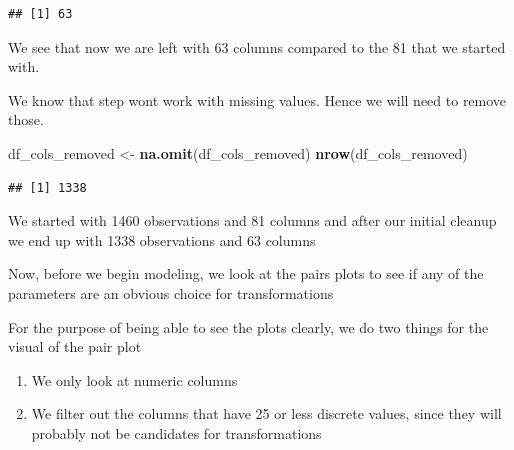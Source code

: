 \documentclass[
]{article}
\newenvironment{Shaded}{\begin{snugshade}}{\end{snugshade}}
\newcommand{\DataTypeTok}[1]{\textcolor[rgb]{0.13,0.29,0.53}{#1}}
\newcommand{\KeywordTok}[1]{\textcolor[rgb]{0.13,0.29,0.53}{\textbf{#1}}}
\newcommand{\NormalTok}[1]{#1}
\newcommand{\OperatorTok}[1]{\textcolor[rgb]{0.81,0.36,0.00}{\textbf{#1}}}
\newcommand{\StringTok}[1]{\textcolor[rgb]{0.31,0.60,0.02}{#1}}
\providecommand{\tightlist}{%
  \setlength{\itemsep}{0pt}\setlength{\parskip}{0pt}}
\begin{document}
\begin{Shaded}
\end{Shaded}

\begin{verbatim}
## [1] 63
\end{verbatim}

We see that now we are left with 63 columns compared to the 81 that we started with.

We know that step wont work with missing values. Hence we will need to remove those.

\begin{Shaded}
\begin{Highlighting}[]
\NormalTok{df_cols_removed <-}\StringTok{ }\KeywordTok{na.omit}\NormalTok{(df_cols_removed)}
\KeywordTok{nrow}\NormalTok{(df_cols_removed)}
\end{Highlighting}
\end{Shaded}

\begin{verbatim}
## [1] 1338
\end{verbatim}

We started with 1460 observations and 81 columns and after our initial cleanup we end up with 1338 observations and 63 columns

Now, before we begin modeling, we look at the pairs plots to see if any of the parameters are an obvious choice for transformations

For the purpose of being able to see the plots clearly, we do two things for the visual of the pair plot

\begin{enumerate}
\def\labelenumi{\arabic{enumi})}
\tightlist
\item
  We only look at numeric columns
\item
  We filter out the columns that have 25 or less discrete values, since they will probably not be candidates for transformations
\end{enumerate}
\end{document}
